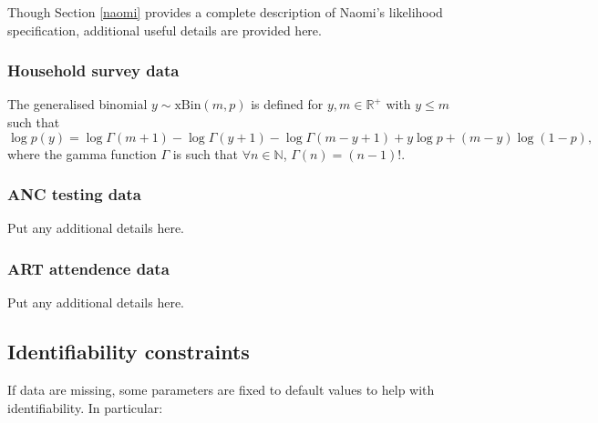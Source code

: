 \documentclass[a4paper, nobind]{templates/ociamthesis}
\begin{document}
Though Section \ref{naomi} provides a complete description of Naomi's likelihood specification, additional useful details are provided here.

\hypertarget{household-survey-data-1}{%
\subsubsection{Household survey data}\label{household-survey-data-1}}

The generalised binomial \(y \sim \text{xBin}(m, p)\) is defined for \(y, m \in \mathbb{R}^+\) with \(y \leq m\) such that
\begin{equation}
\log p(y) = \log \Gamma(m + 1) - \log \Gamma(y + 1) - \log \Gamma(m - y + 1) + y \log p + (m - y) \log(1 - p),
\end{equation}
where the gamma function \(\Gamma\) is such that \(\forall n \in \mathbb{N}\), \(\Gamma(n) = (n - 1)!\).

\hypertarget{anc-testing-data}{%
\subsubsection{ANC testing data}\label{anc-testing-data}}

Put any additional details here.

\hypertarget{art-attendence-data}{%
\subsubsection{ART attendence data}\label{art-attendence-data}}

Put any additional details here.

\hypertarget{naomi-identifiability}{%
\subsection{Identifiability constraints}\label{naomi-identifiability}}

If data are missing, some parameters are fixed to default values to help with identifiability.
In particular:
\end{document}
